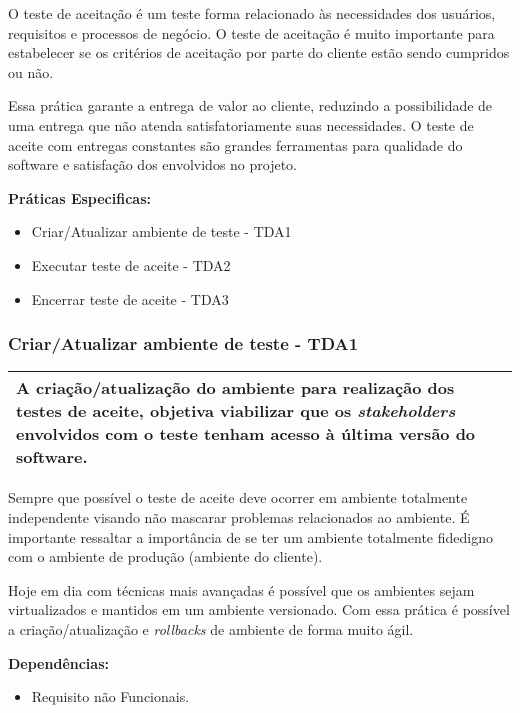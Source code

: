 O teste de aceitação é um teste forma relacionado às necessidades dos usuários, requisitos e processos de negócio. O teste de aceitação é muito importante para estabelecer se os critérios de aceitação por parte do cliente estão sendo cumpridos ou não.

Essa prática garante a entrega de valor ao cliente, reduzindo a possibilidade de uma entrega que não atenda satisfatoriamente suas necessidades. O teste de aceite com entregas constantes são grandes ferramentas para qualidade do software e satisfação dos envolvidos no projeto.

\textbf{Práticas Especificas:}
\begin{itemize}
    \item  Criar/Atualizar ambiente de teste - TDA1
    \item  Executar teste de aceite - TDA2
    \item  Encerrar teste de aceite - TDA3
\end{itemize}


\subsubsection{Criar/Atualizar ambiente de teste - TDA1}
\label{sec:tda1}

\begin{table}[!ht]
\centering
\begin{tabular}{|p{130mm}|}
\hline
A criação/atualização do ambiente para realização dos testes de aceite, objetiva viabilizar que os \textit{stakeholders} envolvidos com o teste tenham acesso à última versão do software. \\ 
\hline
\end{tabular}
\end{table}

Sempre que possível o teste de aceite deve ocorrer em ambiente totalmente independente visando não mascarar problemas relacionados ao ambiente. É importante ressaltar a importância de se ter um ambiente totalmente fidedigno com o ambiente de produção (ambiente do cliente).

Hoje em dia com técnicas mais avançadas é possível que os ambientes sejam virtualizados e mantidos em um ambiente versionado. Com essa prática é possível a criação/atualização e \textit{rollbacks} de ambiente de forma muito ágil.

\textbf{Dependências: }
\begin{itemize}
    \item  Requisito não Funcionais.
\end{itemize}

